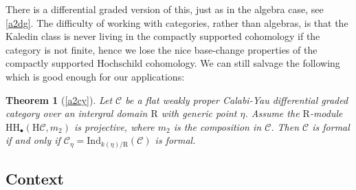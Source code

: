 \documentclass{article}
\theoremstyle{plain}
\newtheorem{theorem}{Theorem}[subsection]   %
\theoremstyle{definition}
\theoremstyle{remark}
\newcommand{\mr}{\mathrm}
\newcommand{\Cc}{\mathcal C}
\newcommand{\3}{\vspace{3mm}}
\newcommand{\2}{\vspace{2mm}}
\newcommand{\1}{\vspace{1mm}}
\begin{document}
There is a differential graded version of this, just as in the algebra case, see \cref{a2dg}. The difficulty of working with categories, rather than algebras, is that the Kaledin class is never living in the compactly supported cohomology if the category is not finite, hence we lose the nice base-change properties of the compactly supported Hochschild cohomology. We can still salvage the following which is good enough for our applications:
\2
\begin{theorem}[\cref{a2cy}]
Let $\Cc$ be a flat weakly proper Calabi-Yau differential graded category over an intergral domain $\mr{R}$ with generic point $\eta$. Assume the $\mr{R}$-module $\mr{HH}_\bullet(\mr{H}\Cc,m_2)$ is projective, where $m_2$ is the composition in $\Cc$. Then $\Cc$ is formal if and only if $\Cc_\eta=\mr{Ind}_{k(\eta)/\mr{R}}(\Cc)$ is formal.
\end{theorem}
\subsection{\textbf{Context}}
\end{document}
